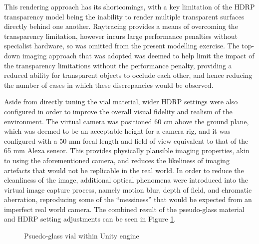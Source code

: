 \documentclass[10pt]{article}
\begin{document}
This rendering approach has its shortcomings, with a key limitation of the HDRP transparency model being the inability to render multiple transparent surfaces directly behind one another. Raytracing provides a means of overcoming the transparency limitation, however incurs large performance penalties without specialist hardware, so was omitted from the present modelling exercise. The top-down imaging approach that was adopted was deemed to help limit the impact of the transparency limitations without the performance penalty, providing a reduced ability for transparent objects to occlude each other, and hence reducing the number of cases in which these discrepancies would be observed.

Aside from directly tuning the vial material, wider HDRP settings were also configured in order to improve the overall visual fidelity and realism of the environment. The virtual camera was positioned 60 cm above the ground plane, which was deemed to be an acceptable height for a camera rig, and it was configured with a 50 mm focal length and field of view equivalent to that of the 65 mm Alexa sensor. This provides physically plausible imaging properties, akin to using the aforementioned camera, and reduces the likeliness of imaging artefacts that would not be replicable in the real world. In order to reduce the cleanliness of the image, additional optical phenomena were introduced into the virtual image capture process, namely motion blur, depth of field, and chromatic aberration, reproducing some of the ``messiness'' that would be expected from an imperfect real world camera. The combined result of the pseudo-glass material and HDRP setting adjustments can be seen in Figure \ref{fig:vial_appearance}.

\vfill
\begin{figure}[h]%
    \centering
    \qquad %
    \caption{Psuedo-glass vial within Unity engine}
    \label{fig:vial_appearance}%
\end{figure}
\vfill
\end{document}
